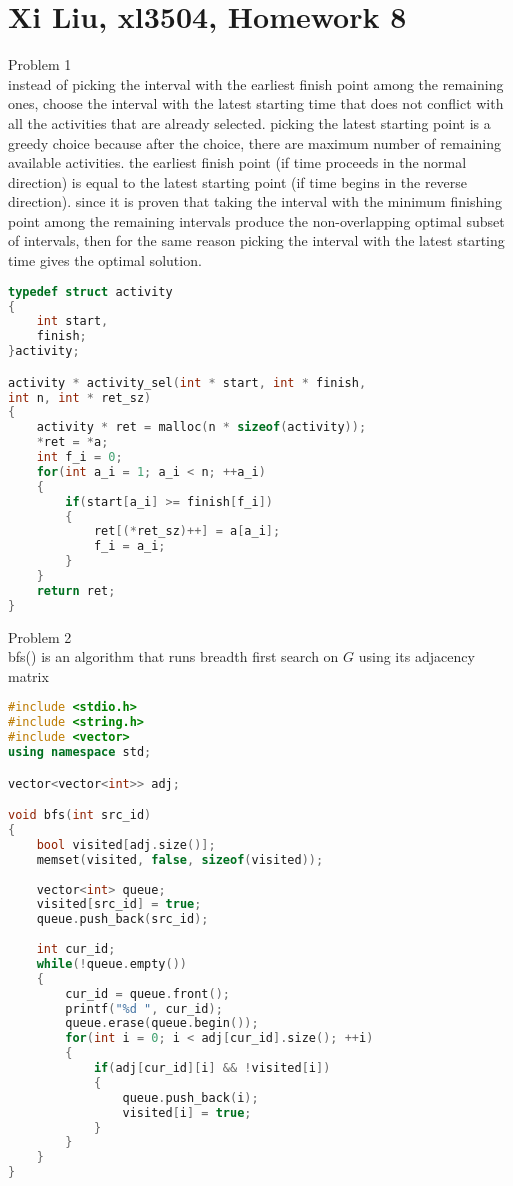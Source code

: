 \documentclass[12pt,border=4pt,multi]{article} %
\begin{document}
\section*{Xi Liu, xl3504, Homework 8}
Problem 1\\
instead of picking the interval with the earliest finish point among the remaining ones, choose the interval with the latest starting time that does not conflict with all the activities that are already selected. picking the latest starting point is a greedy choice because after the choice, there are maximum number of remaining available activities. the earliest finish point (if time proceeds in the normal direction) is equal to the latest starting point (if time begins in the reverse direction). since it is proven that taking the interval with the minimum finishing point among the remaining intervals produce the non-overlapping optimal subset of intervals, then for the same reason picking the interval with the latest starting time gives the optimal solution. 
\begin{lstlisting}[language = c]
typedef struct activity
{
    int start,
    finish;
}activity;

activity * activity_sel(int * start, int * finish,
int n, int * ret_sz)
{
    activity * ret = malloc(n * sizeof(activity));
    *ret = *a;
    int f_i = 0;
    for(int a_i = 1; a_i < n; ++a_i)
    {
        if(start[a_i] >= finish[f_i])
        {
            ret[(*ret_sz)++] = a[a_i];
            f_i = a_i;  
        }
    }
    return ret;
}
\end{lstlisting}
\newpage
\noindent
Problem 2\\
bfs() is an algorithm that runs breadth first search on $G$ using its adjacency matrix
\begin{lstlisting}[language = c++]
#include <stdio.h>
#include <string.h>
#include <vector>
using namespace std;

vector<vector<int>> adj;

void bfs(int src_id)
{
    bool visited[adj.size()];
    memset(visited, false, sizeof(visited));
    
    vector<int> queue;
    visited[src_id] = true;
    queue.push_back(src_id);
    
    int cur_id;
    while(!queue.empty())
    {
        cur_id = queue.front();
        printf("%d ", cur_id);
        queue.erase(queue.begin());
        for(int i = 0; i < adj[cur_id].size(); ++i)
        {
            if(adj[cur_id][i] && !visited[i])
            {
                queue.push_back(i);
                visited[i] = true;
            }
        }
    }
}
\end{lstlisting}
\end{document}
